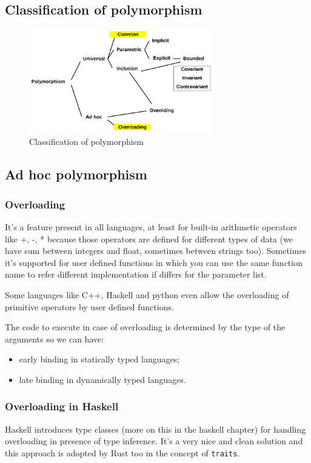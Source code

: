 \subsection{Classification of polymorphism}
\begin{figure}[H]
    \centering
    \includegraphics[width=300px]{images/5_Polymorphism/classification.png}
    \caption{Classification of polymorphism}
\end{figure}

\subsection{Ad hoc polymorphism}
\subsubsection{Overloading}
It's a feature present in all languages, at least for built-in arithmetic operators like +, -, * because those operators are defined for different types of data (we have sum between integers and float, sometimes between strings too).
Sometimes it's supported for user defined functions in which you can use the same function name to refer different implementation if differs for the parameter list.

Some languages like C++, Haskell and python even allow the overloading of primitive operators by user defined functions.

The code to execute in case of overloading is determined by the type of the arguments so we can have:
\begin{itemize}
    \item early binding in statically typed languages;
    \item late binding in dynamically typed languages.
\end{itemize}

\subsubsection{Overloading in Haskell}
Haskell introduces type classes (more on this in the haskell chapter) for handling overloading in presence of type inference.
It's a very nice and clean solution and this approach is adopted by Rust too in the concept of \verb|traits|.

